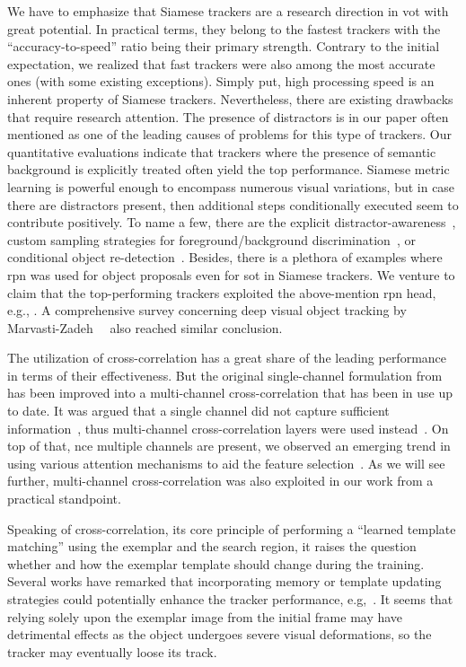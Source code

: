 We have to emphasize that Siamese trackers are a research direction in \gls{vot} with great potential. In practical terms, they belong to the fastest trackers with the ``accuracy-to-speed'' ratio being their primary strength. Contrary to the initial expectation, we realized that fast trackers were also among the most accurate ones (with some existing exceptions). Simply put, high processing speed is an inherent property of Siamese trackers. Nevertheless, there are existing drawbacks that require research attention. The presence of distractors is in our paper often mentioned as one of the leading causes of problems for this type of trackers. Our quantitative evaluations indicate that trackers where the presence of semantic background is explicitly treated often yield the top performance. Siamese metric learning is powerful enough to encompass numerous visual variations, but in case there are distractors present, then additional steps conditionally executed seem to contribute positively. To name a few, there are the explicit distractor-awareness~\cite{zhu2018dasiamrpn}, custom sampling strategies for foreground/background discrimination~\cite{li2020figsiam}, or conditional object re-detection~\cite{li2019siamrm}. Besides, there is a plethora of examples where \gls{rpn} was used for object proposals even for \gls{sot} in Siamese trackers. We venture to claim that the top-performing trackers exploited the above-mention \gls{rpn} head, e.g., \cite{li2018siamrpn, zhu2018dasiamrpn, li2018siamrpnpp}. A comprehensive survey concerning deep visual object tracking by Marvasti-Zadeh~\etal{}~\cite{marvastizadeh2021survey} also reached similar conclusion.

The utilization of cross-correlation has a great share of the leading performance in terms of their effectiveness. But the original single-channel formulation from~\cite{bertinetto2016siamfc} has been improved into a multi-channel cross-correlation that has been in use up to date. It was argued that a single channel did not capture sufficient information~\cite{guo2019siamcar}, thus multi-channel cross-correlation layers were used instead~\cite{li2018siamrpnpp}. On top of that, nce multiple channels are present, we observed an emerging trend in using various attention mechanisms to aid the feature selection~\cite{wang2018learningattentions}. As we will see further, multi-channel cross-correlation was also exploited in our work from a practical standpoint.

Speaking of cross-correlation, its core principle of performing a ``learned template matching'' using the exemplar and the search region, it raises the question whether and how the exemplar template should change during the training. Several works have remarked that incorporating memory or template updating strategies could potentially enhance the tracker performance, e.g,~\cite{bertinetto2016siamfc, liang2019lssiam}. It seems that relying solely upon the exemplar image from the initial frame may have detrimental effects as the object undergoes severe visual deformations, so the tracker may eventually loose its track.


